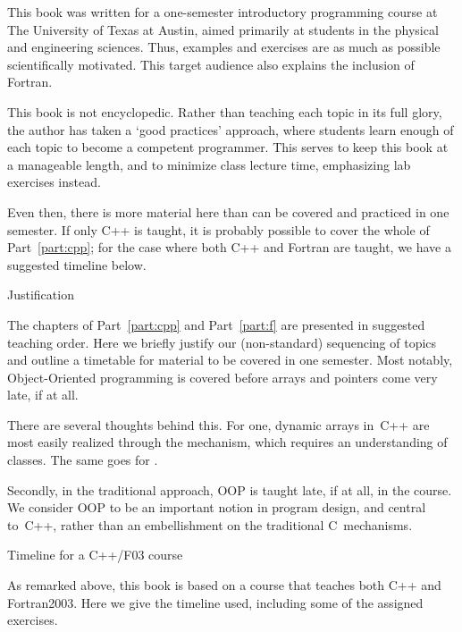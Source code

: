 
This book was written for a one-semester introductory programming course at The
University of Texas at Austin, aimed primarily at students in the
physical and engineering sciences. Thus, examples and exercises are as
much as possible scientifically motivated. This target audience also
explains the inclusion of Fortran.

This book is not encyclopedic. Rather than teaching each topic in its
full glory,
the author has taken a `good practices' approach, where students learn
enough of each topic to become a competent programmer. This serves to
keep this book at a manageable length, and to minimize class lecture
time, emphasizing lab exercises instead.

Even then, there is more material here than can be covered and
practiced in one semester. If only C++ is taught, it is probably
possible to cover the whole of Part~\ref{part:cpp}; for the case where
both C++ and Fortran are taught, we have a suggested timeline below.

 {Justification}

The chapters of Part~\ref{part:cpp} and Part~\ref{part:f} are
presented in suggested teaching order. 
Here we briefly justify our (non-standard) sequencing of topics and
outline a timetable for material to be covered in one semester.
Most notably, Object-Oriented programming is covered
before arrays and pointers come very late, if at all.

There are several thoughts behind this. For one, dynamic arrays in~C++
are most easily realized through the  mechanism, which
requires an understanding of classes. The same goes for
.

Secondly, in the traditional approach, OOP is taught late, if at all, in
the course. We consider OOP to be an important notion in program
design, and central to~C++, rather than an embellishment on the
traditional C~mechanisms.

 {Timeline for a C++/F03 course}

As remarked above, this book is based on a course that teaches both
C++ and Fortran2003. Here we give the timeline used, including some of
the assigned exercises.

